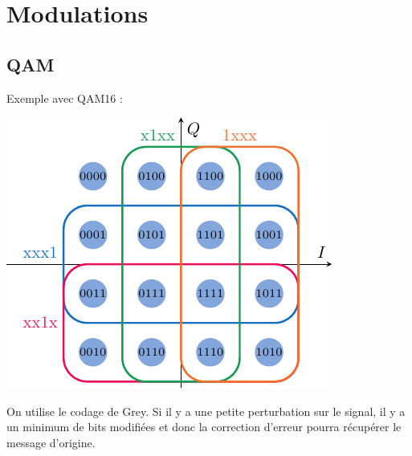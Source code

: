 \documentclass[resume]{subfiles}
\begin{document}
\section{Modulations}
\subsection{QAM}
Exemple avec QAM16 :
\begin{center}
\includegraphics[scale=0.75]{drwg_5.pdf}
\end{center}
On utilise le codage de Grey. Si il y a une petite perturbation sur le signal, il y a un minimum de bits modifiées et donc la correction d'erreur pourra récupérer le message d'origine.
\end{document}
